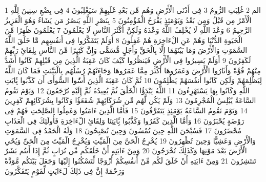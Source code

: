\documentclass[20pt,a4paper]{article}
\title{}
\author{}
\date{}
\begin{document}
\pagecolor{cl_page}



{\tiny\colorbox{cl_aya}{1}} الم
{\tiny\colorbox{cl_aya}{2}} غُلِبَتِ الرُّومُ
{\tiny\colorbox{cl_aya}{3}} فِى أَدْنَى الْأَرْضِ وَهُم مِّن بَعْدِ غَلَبِهِمْ سَيَغْلِبُونَ
{\tiny\colorbox{cl_aya}{4}} فِى بِضْعِ سِنِينَ لِلَّهِ الْأَمْرُ مِن قَبْلُ وَمِن بَعْدُ وَيَوْمَئِذٍ يَفْرَحُ الْمُؤْمِنُونَ
{\tiny\colorbox{cl_aya}{5}} بِنَصْرِ اللَّهِ يَنصُرُ مَن يَشَاءُ وَهُوَ الْعَزِيزُ الرَّحِيمُ
{\tiny\colorbox{cl_aya}{6}} وَعْدَ اللَّهِ لَا يُخْلِفُ اللَّهُ وَعْدَهُ وَلَكِنَّ أَكْثَرَ النَّاسِ لَا يَعْلَمُونَ
{\tiny\colorbox{cl_aya}{7}} يَعْلَمُونَ ظَهِرًا مِّنَ الْحَيَوةِ الدُّنْيَا وَهُمْ عَنِ الْءَاخِرَةِ هُمْ غَفِلُونَ
{\tiny\colorbox{cl_aya}{8}} أَوَلَمْ يَتَفَكَّرُوا فِى أَنفُسِهِم مَّا خَلَقَ اللَّهُ السَّمَوَتِ وَالْأَرْضَ وَمَا بَيْنَهُمَا إِلَّا بِالْحَقِّ وَأَجَلٍ مُّسَمًّى وَإِنَّ كَثِيرًا مِّنَ النَّاسِ بِلِقَائِ رَبِّهِمْ لَكَفِرُونَ
{\tiny\colorbox{cl_aya}{9}} أَوَلَمْ يَسِيرُوا فِى الْأَرْضِ فَيَنظُرُوا كَيْفَ كَانَ عَقِبَةُ الَّذِينَ مِن قَبْلِهِمْ كَانُوا أَشَدَّ مِنْهُمْ قُوَّةً وَأَثَارُوا الْأَرْضَ وَعَمَرُوهَا أَكْثَرَ مِمَّا عَمَرُوهَا وَجَاءَتْهُمْ رُسُلُهُم بِالْبَيِّنَتِ فَمَا كَانَ اللَّهُ لِيَظْلِمَهُمْ وَلَكِن كَانُوا أَنفُسَهُمْ يَظْلِمُونَ
{\tiny\colorbox{cl_aya}{10}} ثُمَّ كَانَ عَقِبَةَ الَّذِينَ أَسَُٔوا السُّوأَى أَن كَذَّبُوا بَِٔايَتِ اللَّهِ وَكَانُوا بِهَا يَسْتَهْزِءُونَ
{\tiny\colorbox{cl_aya}{11}} اللَّهُ يَبْدَؤُا الْخَلْقَ ثُمَّ يُعِيدُهُ ثُمَّ إِلَيْهِ تُرْجَعُونَ
{\tiny\colorbox{cl_aya}{12}} وَيَوْمَ تَقُومُ السَّاعَةُ يُبْلِسُ الْمُجْرِمُونَ
{\tiny\colorbox{cl_aya}{13}} وَلَمْ يَكُن لَّهُم مِّن شُرَكَائِهِمْ شُفَعَؤُا وَكَانُوا بِشُرَكَائِهِمْ كَفِرِينَ
{\tiny\colorbox{cl_aya}{14}} وَيَوْمَ تَقُومُ السَّاعَةُ يَوْمَئِذٍ يَتَفَرَّقُونَ
{\tiny\colorbox{cl_aya}{15}} فَأَمَّا الَّذِينَ ءَامَنُوا وَعَمِلُوا الصَّلِحَتِ فَهُمْ فِى رَوْضَةٍ يُحْبَرُونَ
{\tiny\colorbox{cl_aya}{16}} وَأَمَّا الَّذِينَ كَفَرُوا وَكَذَّبُوا بَِٔايَتِنَا وَلِقَائِ الْءَاخِرَةِ فَأُولَئِكَ فِى الْعَذَابِ مُحْضَرُونَ
{\tiny\colorbox{cl_aya}{17}} فَسُبْحَنَ اللَّهِ حِينَ تُمْسُونَ وَحِينَ تُصْبِحُونَ
{\tiny\colorbox{cl_aya}{18}} وَلَهُ الْحَمْدُ فِى السَّمَوَتِ وَالْأَرْضِ وَعَشِيًّا وَحِينَ تُظْهِرُونَ
{\tiny\colorbox{cl_aya}{19}} يُخْرِجُ الْحَىَّ مِنَ الْمَيِّتِ وَيُخْرِجُ الْمَيِّتَ مِنَ الْحَىِّ وَيُحْىِ الْأَرْضَ بَعْدَ مَوْتِهَا وَكَذَلِكَ تُخْرَجُونَ
{\tiny\colorbox{cl_aya}{20}} وَمِنْ ءَايَتِهِ أَنْ خَلَقَكُم مِّن تُرَابٍ ثُمَّ إِذَا أَنتُم بَشَرٌ تَنتَشِرُونَ
{\tiny\colorbox{cl_aya}{21}} وَمِنْ ءَايَتِهِ أَنْ خَلَقَ لَكُم مِّنْ أَنفُسِكُمْ أَزْوَجًا لِّتَسْكُنُوا إِلَيْهَا وَجَعَلَ بَيْنَكُم مَّوَدَّةً وَرَحْمَةً إِنَّ فِى ذَلِكَ لَءَايَتٍ لِّقَوْمٍ يَتَفَكَّرُونَ
\end{document}
